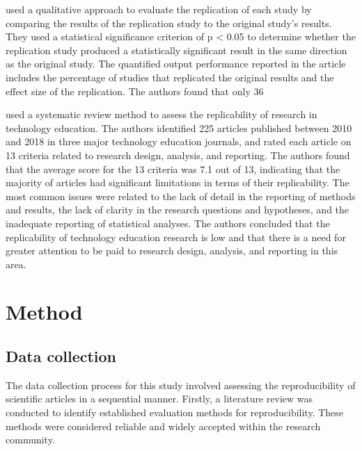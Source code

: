 \documentclass[12pt, a4paper, twocolumn]{article}
\begin{document}
			\citet{Thompson2006} used a qualitative approach to evaluate the replication of each study by comparing the results of the replication study to the original study's results. They used a statistical significance criterion of p < 0.05 to determine whether the replication study produced a statistically significant result in the same direction as the original study. The quantified output performance reported in the article includes the percentage of studies that replicated the original results and the effect size of the replication. The authors found that only 36%

			\citet{Estimatingthereplicability} used a systematic review method to assess the replicability of research in technology education. The authors identified 225 articles published between 2010 and 2018 in three major technology education journals, and rated each article on 13 criteria related to research design, analysis, and reporting. The authors found that the average score for the 13 criteria was 7.1 out of 13, indicating that the majority of articles had significant limitations in terms of their replicability. The most common issues were related to the lack of detail in the reporting of methods and results, the lack of clarity in the research questions and hypotheses, and the inadequate reporting of statistical analyses. The authors concluded that the replicability of technology education research is low and that there is a need for greater attention to be paid to research design, analysis, and reporting in this area.

	
	\section{Method}
		\subsection{Data collection}
		The data collection process for this study involved assessing the reproducibility of scientific articles in a sequential manner. Firstly, a literature review was conducted to identify established evaluation methods for reproducibility. These methods were considered reliable and widely accepted within the research community.
		
\end{document}
